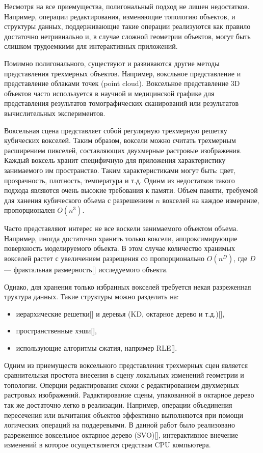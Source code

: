 Несмотря на все приемущества, полигональный подход не лишен недостатков. Например, операции редактирования, изменяющие топологию объектов, и структуры данных, поддерживающие такие операции реализуются как правило достаточно нетривиально и, в случае сложной геометрии объектов, могут быть слишком трудоемкими для интерактивных приложений.

Помимно полигонального, существуют и развиваются другие методы представления трехмерных объектов. Например, воксльное представление и представление облаками точек (point cloud). Воксельное представление 3D объектов часто используется в научной и медицинской графике для представления результатов томографических сканирований или результатов вычислительных экспериментов.

Воксельная сцена представляет собой регулярную трехмерную решетку кубических вокселей. Таким образом, воксели можно считать трехмерным расширением пикселей, составляющих двухмерные растровые изображения. Каждый воксель хранит специфичную для приложения характеристику занимаемого им пространство. Таким характеристиками могут быть: цвет, прозрачность, плотность, температура и т.д. Одинм из недостатков такого подхода являются очень высокие требования к памяти. Объем памяти, требуемой для ханения кубического объема с разрешением $n$ вокселей на каждое измерение, пропорционален $O(n^3)$.

Часто представляют интерес не все воскели занимаемого объектом объема. Например, иногда достаточно хранить только воксели, аппроксимирующие поверхность моделируемого объекта. В этом случае количество хранимых вокселей растет с увеличением разрещения со пропорционально $O(n^D)$, где $D$ --- фрактальная размерность[] исследуемого объекта.

Однако, для хранения только избранных вокселей требуется некая разреженная труктура данных. Такие структуры можно разделить на:
\begin{itemize}
\item иерархические решетки[] и деревья (KD, октарное дерево и т.д.)[],
\item пространственные хэши[],
\item использующие алгоритмы сжатия, например RLE[].
\end{itemize}

Одним из приемуществ воксельного представления трехмерных сцен является сравнительная простота внесения в сцену локальных изменений геометрии и топологии. Оперции редактирования схожи с редактированием двухмерных растровых изображений. Радактирование сцены, упакованной в октарное дерево так же достаточно легко в реализации. Например, операции объединения пересечения или вычитания объектов эффективно выполняются при помощи логических операций на поддеревьями. В данной работ было реализовано разреженное воксельное октарное дерево (SVO)[], интерактивное внечение изменений в которое осуществляется средствам CPU компьютера.

